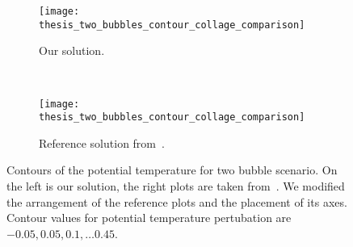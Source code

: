 \begin{figure}[p]
  \centering
  \begin{subfigure}[t]{0.5\textwidth}
    \centering
  \texttt{[image: thesis\_two\_bubbles\_contour\_collage\_comparison]} 
  \caption{Our \amr{} solution.}
  \end{subfigure}~%
  \begin{subfigure}[t]{0.5\textwidth}
    \centering
  \texttt{[image: thesis\_two\_bubbles\_contour\_collage\_comparison]} 
  \caption{Reference solution from~\cite{muller2010adaptive}.}
  \end{subfigure}
  \caption{\label{fig:two-bubbles-contour}%
     Contours of the potential temperature for two bubble scenario.
     On the left is our solution, the right plots are taken from~\cite{muller2010adaptive}.
     We modified the arrangement of the reference plots and the placement of its axes. 
   Contour values for potential temperature pertubation are $-0.05, 0.05, 0.1, \ldots 0.45$.
  }
\end{figure}

